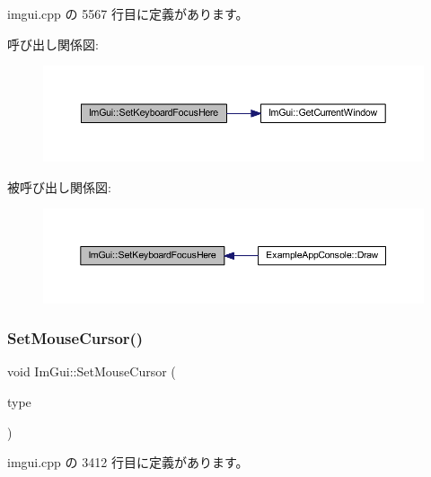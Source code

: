  imgui.\+cpp の 5567 行目に定義があります。

呼び出し関係図\+:\nopagebreak
\begin{figure}[H]
\begin{center}
\leavevmode
\includegraphics[width=350pt]{namespace_im_gui_ae85e5fba7e88cea8bd3ba5b687c979f2_cgraph}
\end{center}
\end{figure}
被呼び出し関係図\+:\nopagebreak
\begin{figure}[H]
\begin{center}
\leavevmode
\includegraphics[width=350pt]{namespace_im_gui_ae85e5fba7e88cea8bd3ba5b687c979f2_icgraph}
\end{center}
\end{figure}
\mbox{\label{namespace_im_gui_ae212a3516efcba50a684df202c8e63ad}} 
\subsubsection{\texorpdfstring{Set\+Mouse\+Cursor()}{SetMouseCursor()}}
{\footnotesize\ttfamily void Im\+Gui\+::\+Set\+Mouse\+Cursor (\begin{DoxyParamCaption}\item[{\mbox{\hyperlink{imgui_8h_a9223d6c82bb5d12c2eab5f829ca520ef}{Im\+Gui\+Mouse\+Cursor}}}]{type }\end{DoxyParamCaption})}



 imgui.\+cpp の 3412 行目に定義があります。

\mbox{\label{namespace_im_gui_ab9a0c20b04a753449494fb20ec2e0e87}} 
